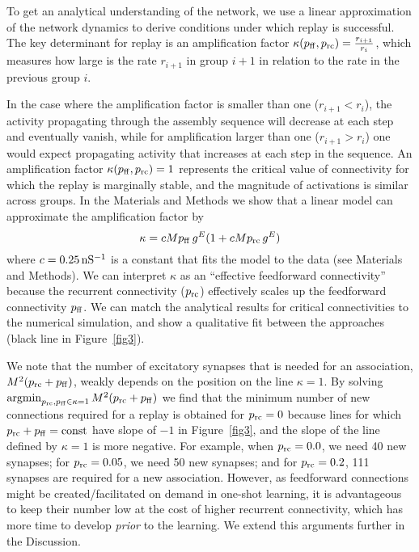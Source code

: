     To get an analytical understanding of the network, we use a linear
    approximation of the network dynamics to derive conditions under which
    replay is successful. The key determinant for replay is an amplification
    factor $\kappa(p_{\rm ff},p_{\rm rc}) = \frac{r_{i+1}}{r_i}$, which
    measures how large is the rate $r_{i+1}$ in group $i+1$ in relation to the
    rate in the previous group $i$.

    In the case where the amplification factor is smaller than one
    ($r_{i+1}<r_i$), the activity propagating through the assembly sequence
    will decrease at each step and eventually vanish, while for amplification
    larger than one ($r_{i+1}>r_i$) one would expect propagating activity that
    increases at each step in the sequence. An amplification factor
    $\kappa(p_{\rm ff},p_{\rm rc})=1$ represents the critical value of
    connectivity for which the replay is marginally stable, and the magnitude
    of activations is similar across groups. In the Materials and Methods we
    show that a linear model can approximate the amplification factor by
    \begin{equation}
      \kappa = c M p_{\rm ff}\, g^{E} (1 + c M p_{\rm rc} \,g^E)  
      \label{eq:kappa2}
    \end{equation}
    where $c = 0.25\, \rm{nS^{-1}}$ is a constant that fits the model to the
    data (see Materials and Methods).  We can interpret $\kappa$ as an
    ``effective feedforward connectivity'' because the recurrent connectivity
    ($p_{\rm rc}$) effectively scales up the feedforward connectivity $p_{\rm
    ff}$.  We can match the analytical results for critical connectivities to
    the numerical simulation, and show a qualitative fit between the approaches
    (black line in Figure~\ref{fig3}).

    We note that the number of excitatory synapses that is needed for an
    association, $M^2(p_{\rm rc}+p_{\rm ff})$, weakly depends on the position
    on the line $\kappa = 1$. By solving $\operatorname*{argmin}_{ p_{\rm rc}, p_{\rm ff} \in
    \kappa=1} M^2(p_{\rm rc} + p_{\rm ff})$ we find that the minimum number of
    new connections required for a replay is obtained for $p_{\rm rc}= 0$
    because lines for which $p_{\rm rc} + p_{\rm ff} = \rm const$ have slope of
    $-1$ in Figure~\ref{fig3}, and the slope of the line defined by
    $\kappa=1$ is more negative. For example, when $p_{\rm rc}=0.0$,
    we need 40 new synapses; for $p_{\rm rc}=0.05$, we need 50 new synapses;
    and for $p_{\rm rc}=0.2$, 111 synapses are required for a new association.
    However, as feedforward connections might be created/facilitated on demand
    in one-shot learning, it is advantageous to keep their number low at the
    cost of higher recurrent connectivity, which has more time to develop {\em
    prior} to the learning. We extend this arguments further in the Discussion.

